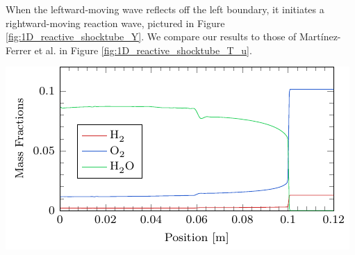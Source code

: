 When the leftward-moving wave reflects off the left boundary, it initiates a rightward-moving
reaction wave, pictured in Figure \ref{fig:1D_reactive_shocktube_Y}. We compare
our results to those of Martínez-Ferrer et al. \cite{MARTINEZFERRER201488}
in Figure \ref{fig:1D_reactive_shocktube_T_u}.

\begin{FigureInMulticol}
    \centering
    \includegraphics[width=\textwidth]{figures/1D_reactive_shocktube/Y.pdf}
    \label{fig:1D_reactive_shocktube_Y}
\end{FigureInMulticol}

